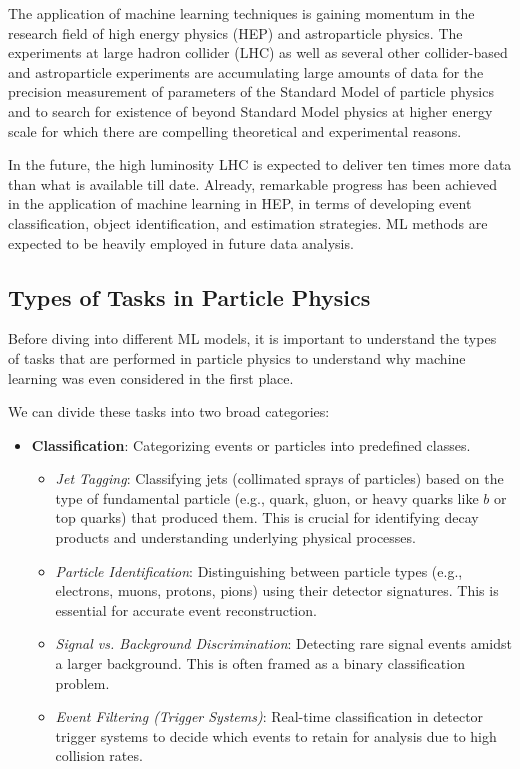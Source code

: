 \documentclass[letterpaper,12pt]{article}
\begin{document}
\begin{spacing}{1.125}
The application of machine learning techniques is gaining momentum in the research field of high energy physics (HEP) and astroparticle physics.
The experiments at large hadron collider (LHC) as well as several other collider-based and astroparticle experiments are accumulating large
amounts of data for the precision measurement of parameters of the Standard Model of particle physics and to search for existence of beyond
Standard Model physics at higher energy scale for which there are compelling theoretical and experimental reasons.

In the future, the high luminosity LHC is expected to deliver ten times more data than what is available till date.
Already, remarkable progress has been achieved in the application of machine learning in HEP,
in terms of developing event classification, object identification, and estimation strategies.
ML methods are expected to be heavily employed in future data analysis.\cite{atlas_ml}

\subsection{Types of Tasks in Particle Physics}

Before diving into different ML models, it is important to understand the types of tasks that are performed in particle physics
to understand why machine learning was even considered in the first place.

We can divide these tasks into two broad categories:
\begin{itemize}
  \item \textbf{Classification}: Categorizing events or particles into predefined classes.
  \begin{itemize}
      \item \textit{Jet Tagging}: Classifying jets (collimated sprays of particles) based on the type of fundamental particle (e.g., quark, gluon, or heavy quarks like $b$ or top quarks) that produced them. This is crucial for identifying decay products and understanding underlying physical processes.
      \item \textit{Particle Identification}: Distinguishing between particle types (e.g., electrons, muons, protons, pions) using their detector signatures. This is essential for accurate event reconstruction.
      \item \textit{Signal vs. Background Discrimination}: Detecting rare signal events amidst a larger background. This is often framed as a binary classification problem.
      \item \textit{Event Filtering (Trigger Systems)}: Real-time classification in detector trigger systems to decide which events to retain for analysis due to high collision rates.
  \end{itemize}


\end{itemize}
\end{spacing}
\end{document}
